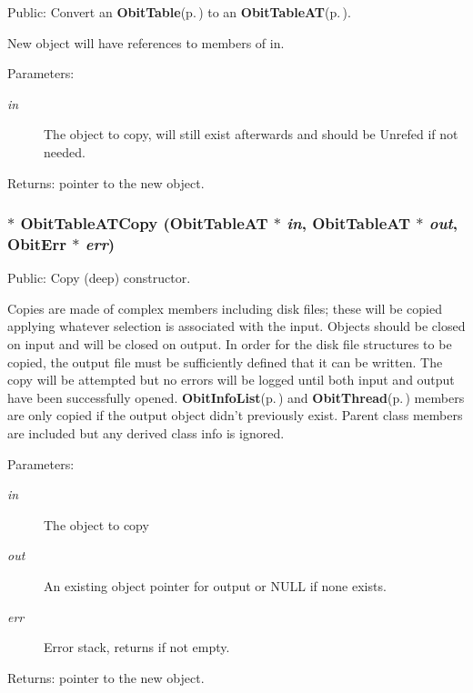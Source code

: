 Public: Convert an {\bf Obit\-Table}{\rm (p.\,\pageref{structObitTable})} to an {\bf Obit\-Table\-AT}{\rm (p.\,\pageref{structObitTableAT})}. 

New object will have references to members of in. \begin{Desc}
\item[Parameters:]
\begin{description}
\item[{\em in}]The object to copy, will still exist afterwards and should be Unrefed if not needed. \end{description}
\end{Desc}
\begin{Desc}
\item[Returns:]pointer to the new object. \end{Desc}
\subsubsection{$\ast$ Obit\-Table\-ATCopy ({\bf Obit\-Table\-AT} $\ast$ {\em in}, {\bf Obit\-Table\-AT} $\ast$ {\em out}, {\bf Obit\-Err} $\ast$ {\em err})}\label{ObitTableAT_8h_a14}


Public: Copy (deep) constructor. 

Copies are made of complex members including disk files; these will be copied applying whatever selection is associated with the input. Objects should be closed on input and will be closed on output. In order for the disk file structures to be copied, the output file must be sufficiently defined that it can be written. The copy will be attempted but no errors will be logged until both input and output have been successfully opened. {\bf Obit\-Info\-List}{\rm (p.\,\pageref{structObitInfoList})} and {\bf Obit\-Thread}{\rm (p.\,\pageref{structObitThread})} members are only copied if the output object didn't previously exist. Parent class members are included but any derived class info is ignored. \begin{Desc}
\item[Parameters:]
\begin{description}
\item[{\em in}]The object to copy \item[{\em out}]An existing object pointer for output or NULL if none exists. \item[{\em err}]Error stack, returns if not empty. \end{description}
\end{Desc}
\begin{Desc}
\item[Returns:]pointer to the new object. \end{Desc}
